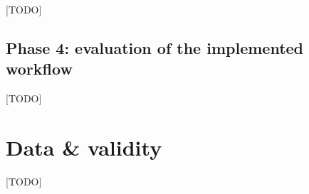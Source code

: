 [TODO]

\subsection{Phase 4: evaluation of the implemented workflow}

[TODO]

\section{Data \& validity}
[TODO]












